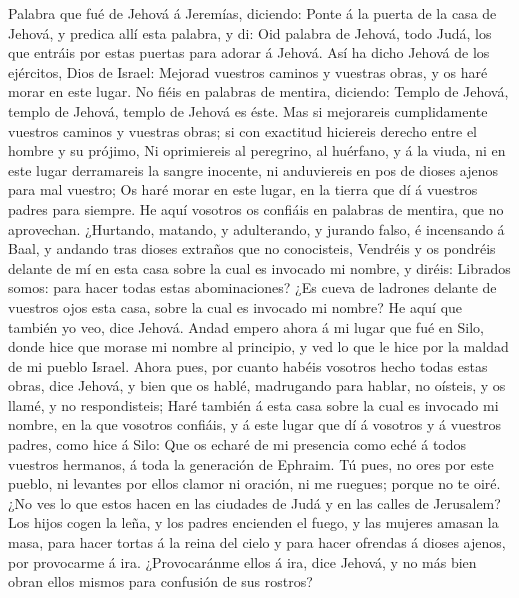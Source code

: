 Palabra que fué de Jehová á Jeremías, diciendo:
 Ponte á la puerta de la casa de Jehová, y predica allí
esta palabra, y di: Oid palabra de Jehová, todo Judá, los que entráis
por estas puertas para adorar á Jehová.  Así ha dicho
Jehová de los ejércitos, Dios de Israel: Mejorad vuestros caminos y
vuestras obras, y os haré morar en este lugar.  No fiéis
en palabras de mentira, diciendo: Templo de Jehová, templo de Jehová,
templo de Jehová es éste.  Mas si mejorareis cumplidamente
vuestros caminos y vuestras obras; si con exactitud hiciereis derecho
entre el hombre y su prójimo,  Ni oprimiereis al
peregrino, al huérfano, y á la viuda, ni en este lugar derramareis la
sangre inocente, ni anduviereis en pos de dioses ajenos para mal
vuestro;  Os haré morar en este lugar, en la tierra que dí
á vuestros padres para siempre.  He aquí vosotros os
confiáis en palabras de mentira, que no aprovechan. 
¿Hurtando, matando, y adulterando, y jurando falso, é incensando á Baal,
y andando tras dioses extraños que no conocisteis, 
Vendréis y os pondréis delante de mí en esta casa sobre la cual es
invocado mi nombre, y diréis: Librados somos: para hacer todas estas
abominaciones?  ¿Es cueva de ladrones delante de vuestros
ojos esta casa, sobre la cual es invocado mi nombre? He aquí que también
yo veo, dice Jehová.  Andad empero ahora á mi lugar que
fué en Silo, donde hice que morase mi nombre al principio, y ved lo que
le hice por la maldad de mi pueblo Israel.  Ahora pues,
por cuanto habéis vosotros hecho todas estas obras, dice Jehová, y bien
que os hablé, madrugando para hablar, no oísteis, y os llamé, y no
respondisteis;  Haré también á esta casa sobre la cual es
invocado mi nombre, en la que vosotros confiáis, y á este lugar que dí á
vosotros y á vuestros padres, como hice á Silo:  Que os
echaré de mi presencia como eché á todos vuestros hermanos, á toda la
generación de Ephraim.  Tú pues, no ores por este pueblo,
ni levantes por ellos clamor ni oración, ni me ruegues; porque no te
oiré.  ¿No ves lo que estos hacen en las ciudades de Judá
y en las calles de Jerusalem?  Los hijos cogen la leña, y
los padres encienden el fuego, y las mujeres amasan la masa, para hacer
tortas á la reina del cielo y para hacer ofrendas á dioses ajenos, por
provocarme á ira.  ¿Provocaránme ellos á ira, dice
Jehová, y no más bien obran ellos mismos para confusión de sus rostros?
